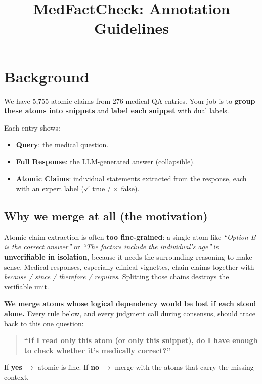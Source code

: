 \documentclass{article}
\title{MedFactCheck: Annotation Guidelines}
\author{
}
\begin{document}
\maketitle


\section{Background}
\label{sec:background}

We have 5{,}755 atomic claims from 276 medical QA entries. Your job is to \textbf{group these atoms into snippets} and \textbf{label each snippet} with dual labels.

Each entry shows:
\begin{itemize}[leftmargin=*,itemsep=2pt]
    \item \textbf{Query}: the medical question.
    \item \textbf{Full Response}: the LLM-generated answer (collapsible).
    \item \textbf{Atomic Claims}: individual statements extracted from the response, each with an expert label ($\checkmark$ true / $\times$ false).
\end{itemize}

\subsection*{Why we merge at all (the motivation)}

Atomic-claim extraction is often \textbf{too fine-grained}: a single atom like \textit{``Option B is the correct answer''} or \textit{``The factors include the individual's age''} is \textbf{unverifiable in isolation}, because it needs the surrounding reasoning to make sense. Medical responses, especially clinical vignettes, chain claims together with \textit{because / since / therefore / requires}. Splitting those chains destroys the verifiable unit.

\textbf{We merge atoms whose logical dependency would be lost if each stood alone.} Every rule below, and every judgment call during consensus, should trace back to this one question:

\begin{quote}
\textbf{``If I read only this atom (or only this snippet), do I have enough to check whether it's medically correct?''}
\end{quote}

If \textbf{yes} $\rightarrow$ atomic is fine. If \textbf{no} $\rightarrow$ merge with the atoms that carry the missing context.
\end{document}
